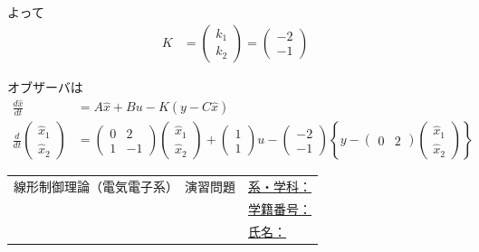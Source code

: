 \documentclass[a4paper,11pt]{jreport}
\begin{document}
よって
\begin{align*}
	K&=
	\left (
	\begin{array}{c}
	 k_1 \\ k_2 
	\end{array}
	\right )
	=
	\left (
	\begin{array}{c}
	 -2 \\ -1 
	\end{array}
	\right )
\end{align*}

オブザーバは
\begin{align*}
 \frac{d \hat{x}}{dt} &= A \hat{x} + B u - K (y - C \hat{x})
\\
 \frac{d}{dt}
	\left (
	\begin{array}{c}
	 \hat{x}_1 \\ \hat{x}_2 
	\end{array}
	\right )
	&=
 	\left (
	\begin{array}{cc}
	 0 & 2 \\
	 1 & -1
	\end{array}
	\right )
	\left (
	\begin{array}{c}
	 \hat{x}_1 \\ \hat{x}_2 
	\end{array}
	\right )
	+ 
	\left (
	\begin{array}{c}
	 1 \\ 1 
	\end{array}
	\right )
	u
	-
	\left (
	\begin{array}{c}
	 -2 \\ -1 
	\end{array}
	\right )
	\left \{
		y -
		\left ( \begin{array}{cc}
			0 & 2 
		\end{array} \right )
		\left (
		\begin{array}{c}
		 \hat{x}_1 \\ \hat{x}_2 
		\end{array}
		\right )
	\right \}
\end{align*}


\newpage
\begin{tabular}{cl}
\hspace*{2cm}
{\large 線形制御理論（電気電子系）　演習問題}
\hspace{1cm}
&
\underline{系・学科：\hspace{3cm}}
\\[2mm]
&\underline{学籍番号：\hspace{3cm}}
\\[2mm]
&\underline{氏名：\hspace{5cm}}
\end{tabular}
\ \\
\end{document}
